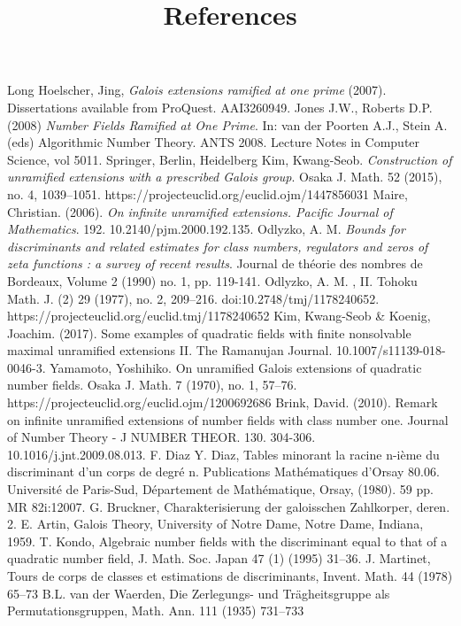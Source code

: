 \documentclass[preprint,12pt,leqno]{elsarticle}
\begin{document}

\begin{thebibliography}{9}
\title{References}
Long Hoelscher, Jing, \textit{Galois extensions ramified at one prime} (2007). Dissertations available from ProQuest. AAI3260949. 
Jones J.W., Roberts D.P. (2008) \textit{Number Fields Ramified at One Prime}. In: van der Poorten A.J., Stein A. (eds) Algorithmic Number Theory. ANTS 2008. Lecture Notes in Computer Science, vol 5011. Springer, Berlin, Heidelberg
Kim, Kwang-Seob. \textit{Construction of unramified extensions with a prescribed Galois group}. Osaka J. Math. 52 (2015), no. 4, 1039--1051. https://projecteuclid.org/euclid.ojm/1447856031
Maire, Christian. (2006). \textit{On infinite unramified extensions. Pacific Journal of Mathematics}. 192. 10.2140/pjm.2000.192.135. 
Odlyzko, A. M. \textit{Bounds for discriminants and related estimates for class numbers, regulators and zeros of zeta functions : a survey of recent results}. Journal de théorie des nombres de Bordeaux, Volume 2 (1990) no. 1, pp. 119-141. 
Odlyzko, A. M. , II. Tohoku Math. J. (2) 29 (1977), no. 2, 209--216. doi:10.2748/tmj/1178240652. https://projecteuclid.org/euclid.tmj/1178240652
Kim, Kwang-Seob & Koenig, Joachim. (2017). Some examples of quadratic fields with finite nonsolvable maximal unramified extensions II. The Ramanujan Journal. 10.1007/s11139-018-0046-3. 
Yamamoto, Yoshihiko. On unramified Galois extensions of quadratic number fields. Osaka J. Math. 7 (1970), no. 1, 57--76. https://projecteuclid.org/euclid.ojm/1200692686
Brink, David. (2010). Remark on infinite unramified extensions of number fields with class number one. Journal of Number Theory - J NUMBER THEOR. 130. 304-306. 10.1016/j.jnt.2009.08.013. 
 F. Diaz Y. Diaz, Tables minorant la racine n-ième du discriminant d'un corps de degré n. Publications Mathématiques d'Orsay 80.06. Université de Paris-Sud, Département de Mathématique, Orsay, (1980). 59 pp. MR 82i:12007.
 G. Bruckner, Charakterisierung der galoisschen Zahlkorper, deren. 2. E. Artin, Galois Theory, University of Notre Dame, Notre Dame, Indiana, 1959.
 T. Kondo, Algebraic number fields with the discriminant equal to that of a quadratic number field, J. Math. Soc. Japan 47 (1)
(1995) 31–36.
 J. Martinet, Tours de corps de classes et estimations de discriminants, Invent. Math. 44 (1978) 65–73
  B.L. van der Waerden, Die Zerlegungs- und Trägheitsgruppe als Permutationsgruppen, Math. Ann. 111 (1935) 731–733
\end{thebibliography}
\end{document}
